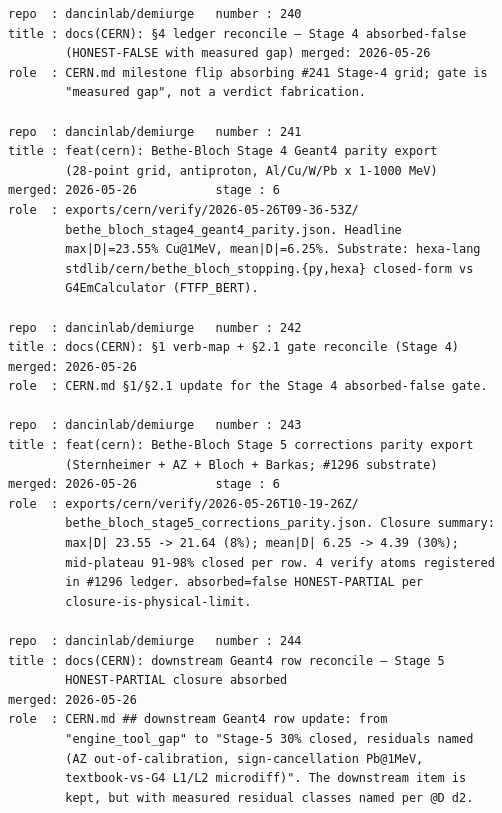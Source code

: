 \begin{lstlisting}
repo  : dancinlab/demiurge   number : 240
title : docs(CERN): §4 ledger reconcile — Stage 4 absorbed-false
        (HONEST-FALSE with measured gap) merged: 2026-05-26
role  : CERN.md milestone flip absorbing #241 Stage-4 grid; gate is
        "measured gap", not a verdict fabrication.

repo  : dancinlab/demiurge   number : 241
title : feat(cern): Bethe-Bloch Stage 4 Geant4 parity export
        (28-point grid, antiproton, Al/Cu/W/Pb x 1-1000 MeV)
merged: 2026-05-26           stage : 6
role  : exports/cern/verify/2026-05-26T09-36-53Z/
        bethe_bloch_stage4_geant4_parity.json. Headline
        max|D|=23.55% Cu@1MeV, mean|D|=6.25%. Substrate: hexa-lang
        stdlib/cern/bethe_bloch_stopping.{py,hexa} closed-form vs
        G4EmCalculator (FTFP_BERT).

repo  : dancinlab/demiurge   number : 242
title : docs(CERN): §1 verb-map + §2.1 gate reconcile (Stage 4)
merged: 2026-05-26
role  : CERN.md §1/§2.1 update for the Stage 4 absorbed-false gate.

repo  : dancinlab/demiurge   number : 243
title : feat(cern): Bethe-Bloch Stage 5 corrections parity export
        (Sternheimer + AZ + Bloch + Barkas; #1296 substrate)
merged: 2026-05-26           stage : 6
role  : exports/cern/verify/2026-05-26T10-19-26Z/
        bethe_bloch_stage5_corrections_parity.json. Closure summary:
        max|D| 23.55 -> 21.64 (8%); mean|D| 6.25 -> 4.39 (30%);
        mid-plateau 91-98% closed per row. 4 verify atoms registered
        in #1296 ledger. absorbed=false HONEST-PARTIAL per
        closure-is-physical-limit.

repo  : dancinlab/demiurge   number : 244
title : docs(CERN): downstream Geant4 row reconcile — Stage 5
        HONEST-PARTIAL closure absorbed
merged: 2026-05-26
role  : CERN.md ## downstream Geant4 row update: from
        "engine_tool_gap" to "Stage-5 30% closed, residuals named
        (AZ out-of-calibration, sign-cancellation Pb@1MeV,
        textbook-vs-G4 L1/L2 microdiff)". The downstream item is
        kept, but with measured residual classes named per @D d2.
\end{lstlisting}
